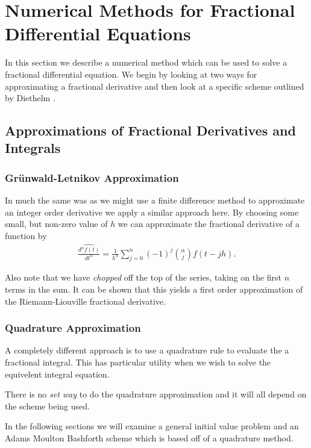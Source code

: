 
\section{Numerical Methods for Fractional Differential Equations}

In this section we describe a numerical method which can be used to solve a fractional differential equation. We begin by looking at two ways for approximating a fractional derivative and then look at a specific scheme outlined by Diethelm \cite{Diethelm2011}.

\subsection{Approximations of Fractional Derivatives and Integrals}

\subsubsection{Gr\"{u}nwald-Letnikov Approximation}
In much the same was as we might use a finite difference method to approximate an integer order derivative we apply a similar approach here. By choosing some small, but non-zero value of $ h $ we can approximate the fractional derivative of a function by
\begin{align}
    \widehat{ \frac{d^\alpha f(t)}{dt^\alpha} } = \frac{1}{h^\alpha} \sum_{j=0}^n (-1)^j {\alpha \choose j} f(t - jh).
\end{align}

Also note that we have \emph{chopped} off the top of the series, taking on the first $ n $ terms in the sum. 
It can be shown \cite{Podlubny1999} that this yields a first order approximation of the Riemann-Liouville fractional derivative.
\subsubsection{Quadrature Approximation}
A completely different approach is to use a quadrature rule to evaluate the a fractional integral. This has particular utility when we wish to solve the equivelent integral equation.

There is no \emph{set way} to do the quadrature approximation and it will all depend on the scheme being used. 

In the following sections we will examine a general initial value problem and an Adams Moulton Bashforth scheme which is based off of a quadrature method. \cite{Diethelm2011}

